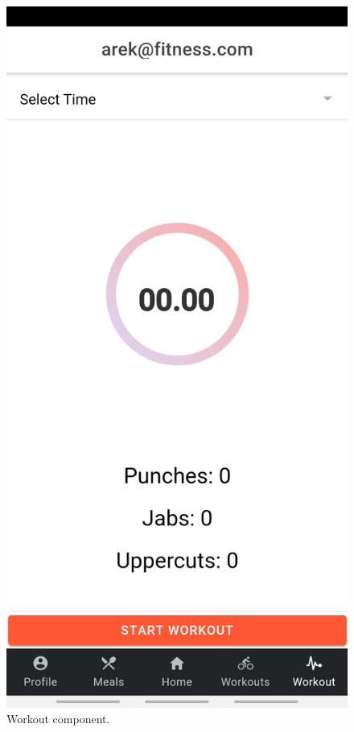 \documentclass[a4paper,12pt]{report}
\begin{document}
\begin{figure}[ht] 
  \label{ fig7} 
  \begin{minipage}[b]{0.5\linewidth}
    \centering
    \includegraphics[width=.7\linewidth]{images/aplicationImages/workout.jpg} 
    \caption{Workout component.} 
    \vspace{4ex}
  \end{minipage}%
  \begin{minipage}[b]{0.5\linewidth}
    \centering

\end{minipage}
\end{figure}
\end{document}
